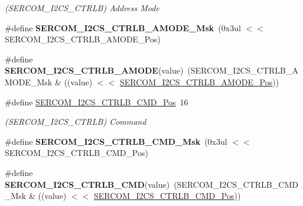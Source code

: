 \begin{DoxyCompactItemize}
\begin{DoxyCompactList}\small\item\em (S\+E\+R\+C\+O\+M\+\_\+\+I2\+C\+S\+\_\+\+C\+T\+R\+L\+B) Address Mode \end{DoxyCompactList}\item 
\hypertarget{group___s_a_m_l21___s_e_r_c_o_m_ga9154dde04914e1c9f121674eb49306eb}{}\#define {\bfseries S\+E\+R\+C\+O\+M\+\_\+\+I2\+C\+S\+\_\+\+C\+T\+R\+L\+B\+\_\+\+A\+M\+O\+D\+E\+\_\+\+Msk}~(0x3ul $<$$<$ S\+E\+R\+C\+O\+M\+\_\+\+I2\+C\+S\+\_\+\+C\+T\+R\+L\+B\+\_\+\+A\+M\+O\+D\+E\+\_\+\+Pos)\label{group___s_a_m_l21___s_e_r_c_o_m_ga9154dde04914e1c9f121674eb49306eb}

\item 
\hypertarget{group___s_a_m_l21___s_e_r_c_o_m_ga85f510bf071c4a3dafded993643723df}{}\#define {\bfseries S\+E\+R\+C\+O\+M\+\_\+\+I2\+C\+S\+\_\+\+C\+T\+R\+L\+B\+\_\+\+A\+M\+O\+D\+E}(value)~(S\+E\+R\+C\+O\+M\+\_\+\+I2\+C\+S\+\_\+\+C\+T\+R\+L\+B\+\_\+\+A\+M\+O\+D\+E\+\_\+\+Msk \& ((value) $<$$<$ \hyperlink{group___s_a_m_l21___s_e_r_c_o_m_ga3a2e9eb3ba2460c2e89a056f56b5e0d4}{S\+E\+R\+C\+O\+M\+\_\+\+I2\+C\+S\+\_\+\+C\+T\+R\+L\+B\+\_\+\+A\+M\+O\+D\+E\+\_\+\+Pos}))\label{group___s_a_m_l21___s_e_r_c_o_m_ga85f510bf071c4a3dafded993643723df}

\item 
\hypertarget{group___s_a_m_l21___s_e_r_c_o_m_gaa6604f85f8a3308c088213612f5252b5}{}\#define \hyperlink{group___s_a_m_l21___s_e_r_c_o_m_gaa6604f85f8a3308c088213612f5252b5}{S\+E\+R\+C\+O\+M\+\_\+\+I2\+C\+S\+\_\+\+C\+T\+R\+L\+B\+\_\+\+C\+M\+D\+\_\+\+Pos}~16\label{group___s_a_m_l21___s_e_r_c_o_m_gaa6604f85f8a3308c088213612f5252b5}

\begin{DoxyCompactList}\small\item\em (S\+E\+R\+C\+O\+M\+\_\+\+I2\+C\+S\+\_\+\+C\+T\+R\+L\+B) Command \end{DoxyCompactList}\item 
\hypertarget{group___s_a_m_l21___s_e_r_c_o_m_gad7742017a0e0854a58c01dae3bcf6226}{}\#define {\bfseries S\+E\+R\+C\+O\+M\+\_\+\+I2\+C\+S\+\_\+\+C\+T\+R\+L\+B\+\_\+\+C\+M\+D\+\_\+\+Msk}~(0x3ul $<$$<$ S\+E\+R\+C\+O\+M\+\_\+\+I2\+C\+S\+\_\+\+C\+T\+R\+L\+B\+\_\+\+C\+M\+D\+\_\+\+Pos)\label{group___s_a_m_l21___s_e_r_c_o_m_gad7742017a0e0854a58c01dae3bcf6226}

\item 
\hypertarget{group___s_a_m_l21___s_e_r_c_o_m_gab8628d7e683e6d9a7be7022c155934e7}{}\#define {\bfseries S\+E\+R\+C\+O\+M\+\_\+\+I2\+C\+S\+\_\+\+C\+T\+R\+L\+B\+\_\+\+C\+M\+D}(value)~(S\+E\+R\+C\+O\+M\+\_\+\+I2\+C\+S\+\_\+\+C\+T\+R\+L\+B\+\_\+\+C\+M\+D\+\_\+\+Msk \& ((value) $<$$<$ \hyperlink{group___s_a_m_l21___s_e_r_c_o_m_gaa6604f85f8a3308c088213612f5252b5}{S\+E\+R\+C\+O\+M\+\_\+\+I2\+C\+S\+\_\+\+C\+T\+R\+L\+B\+\_\+\+C\+M\+D\+\_\+\+Pos}))\label{group___s_a_m_l21___s_e_r_c_o_m_gab8628d7e683e6d9a7be7022c155934e7}


\end{DoxyCompactItemize}
